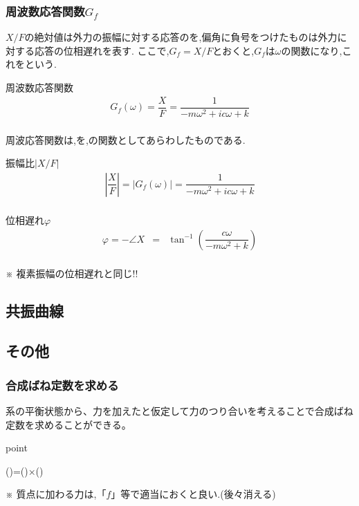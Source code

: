 \documentclass[a4paper]{jsarticle}
\begin{document}
\subsubsection{周波数応答関数$G_f$}
$X/F$の絶対値は外力の振幅に対する応答のを,偏角に負号をつけたものは外力に対する応答の位相遅れを表す.
ここで,$G_f=X/F$とおくと,$G_f$は$\omega$の関数になり,これをという.
\begin{itembox}[l]{周波数応答関数}
    \begin{eqnarray*}
        G_f\left(\omega\right)=\dfrac{X}{F}=\dfrac{1}{-m\omega^2+ic\omega +k}\\
    \end{eqnarray*}
\end{itembox}
周波応答関数は,を,の関数としてあらわしたものである.
\begin{itembox}[l]{振幅比$|X/F|$}
    \begin{eqnarray*}
        \left|\dfrac{X}{F}\right|=|G_f\left(\omega\right)|=\dfrac{1}{-m\omega^2+ic\omega+k}\\
    \end{eqnarray*}
\end{itembox}
\begin{itembox}[l]{位相遅れ$\varphi$}
    \begin{eqnarray*}
        \varphi=-\angle X &=&\tan^{-1}\left(\dfrac{c\omega}{-m\omega^2+k}\right)\\
    \end{eqnarray*}
    \begin{center}
        ※ 複素振幅の位相遅れと同じ!!
    \end{center}
\end{itembox}
\subsection{共振曲線}

\subsection{その他}
\subsubsection{合成ばね定数を求める}
系の平衡状態から、力を加えたと仮定して力のつり合いを考えることで合成ばね定数を求めることができる。
\begin{itembox}[l]{point}
    \begin{center}
        ()\quad=\quad()\quad×\quad()
    \end{center}
\end{itembox}
※ 質点に加わる力は,「$f$」等で適当におくと良い.(後々消える)
\newpage
\end{document}
